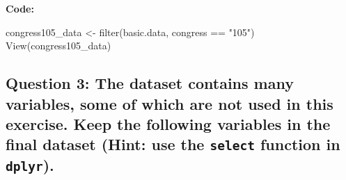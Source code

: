 \documentclass[
]{article}
\newenvironment{Shaded}{\begin{snugshade}}{\end{snugshade}}
\newcommand{\FunctionTok}[1]{\textcolor[rgb]{0.00,0.00,0.00}{#1}}
\newcommand{\NormalTok}[1]{#1}
\newcommand{\OtherTok}[1]{\textcolor[rgb]{0.56,0.35,0.01}{#1}}
\newcommand{\SpecialCharTok}[1]{\textcolor[rgb]{0.00,0.00,0.00}{#1}}
\newcommand{\StringTok}[1]{\textcolor[rgb]{0.31,0.60,0.02}{#1}}
\begin{document}
\textbf{Code:}

\begin{Shaded}
\begin{Highlighting}[]
\NormalTok{congress105\_data }\OtherTok{\textless{}{-}} \FunctionTok{filter}\NormalTok{(basic.data, congress }\SpecialCharTok{==} \StringTok{"105"}\NormalTok{)}
\FunctionTok{View}\NormalTok{(congress105\_data)}
\end{Highlighting}
\end{Shaded}

\hypertarget{question-3-the-dataset-contains-many-variables-some-of-which-are-not-used-in-this-exercise.-keep-the-following-variables-in-the-final-dataset-hint-use-the-select-function-in-dplyr.}{%
\subsection{\texorpdfstring{Question 3: The dataset contains many
variables, some of which are not used in this exercise. Keep the
following variables in the final dataset (Hint: use the \texttt{select}
function in
\texttt{dplyr}).}{Question 3: The dataset contains many variables, some of which are not used in this exercise. Keep the following variables in the final dataset (Hint: use the select function in dplyr).}}\label{question-3-the-dataset-contains-many-variables-some-of-which-are-not-used-in-this-exercise.-keep-the-following-variables-in-the-final-dataset-hint-use-the-select-function-in-dplyr.}}
\end{document}
